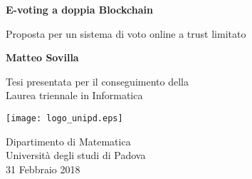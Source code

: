 \begin{titlepage}
    \begin{center}
        \vspace*{1cm}
        
        \Huge
        \textbf{E-voting a doppia Blockchain}
        
        \vspace{0.5cm}
        \large
        Proposta per un sistema di voto online a trust limitato
        
        \vspace{1.5cm}
        
        \textbf{Matteo Sovilla}
        
        \vspace{1cm}
        
        Tesi presentata per il conseguimento della\\
        Laurea triennale in Informatica
        
        \vspace{0.8cm}
        
        \texttt{[image: logo\_unipd.eps]}

        \vspace{0.5cm}
        
        \large
        Dipartimento di Matematica\\
        Università degli studi di Padova\\
        31 Febbraio 2018
        
    \end{center}
\end{titlepage}